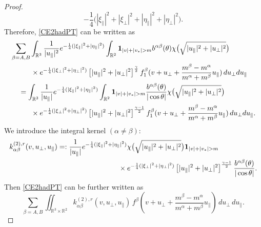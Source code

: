 \documentclass[reqno]{amsart}
\numberwithin{equation}{section}
\numberwithin{equation}{section}
\begin{document}
\begin{proof}
\begin{equation*}
			-\frac{1}{4}\Big(|\xi_{\parallel}|^2+|\xi_{\perp}|^2+|\eta_{\parallel}|^2+|\eta_{\perp}|^2\Big).
		\end{equation*}
		Therefore, \eqref{CE2hadPT} can be written as
		\begin{align}
			& \sum_{\beta=A,B}\int_{\mathbb{R}^3} \frac{1}{|u_{\parallel}|^2} e^{-\frac{1}{4}(|\xi_{\parallel}|^2+|\eta_{\parallel}|^2)}\int_{\mathbb{R}^2}\mathbf{1}_{|v|+|v_*|>m}b^{ \alpha \beta}(\theta)\chi\big(\sqrt{|u_{\parallel}|^2 + |u_{\perp}|^2}\big)  \notag\\
			&\hspace{1cm}\times  e^{-\frac{1}{4}(|\xi_{\perp}|^2+|\eta_{\perp}|^2)} \left[|u_{\parallel}|^2 + |u_{\perp}|^2\right]^{\frac{\gamma}{2}}   f^\beta_1(v + u_{\perp}+\frac{m^{\beta}-m^{\alpha}}{m^{\alpha}+m^{\beta}}u_{\parallel})\, du_{\perp} du_{\parallel} \notag\\
			&\hspace{0.4cm}= \int_{\mathbb{R}^3} \frac{1}{|u_{\parallel}|} e^{-\frac{1}{4}(|\xi_{\parallel}|^2+|\eta_{\parallel}|^2)}\int_{\mathbb{R}^2}\mathbf{1}_{|v|+|v_*|>m} \frac{b^{ \alpha \beta}(\theta)}{|\cos \theta|}\chi\big(\sqrt{|u_{\parallel}|^2 + |u_{\perp}|^2}\big)  \notag\\
			&\hspace{1cm}\times  e^{-\frac{1}{4}(|\xi_{\perp}|^2+|\eta_{\perp}|^2) } \left[|u_{\parallel}|^2 + |u_{\perp}|^2\right]^{\frac{\gamma - 1}{2}}f^\beta_1(v + u_{\perp}+\frac{m^{\beta}-m^{\alpha}}{m^{\alpha}+m^{\beta}}u_{\parallel})  \, du_{\perp} du_{\parallel}.\label{CEs2BDSHH224D2}
		\end{align}
		We introduce the integral kernel $(\alpha \neq \beta)$:
		\begin{align}
			k_{\alpha \beta}^{(2),r}(v,u_{\perp},u_{\parallel})	&=:  \frac{1}{|u_{\parallel}|} e^{-\frac{1}{4}(|\xi_{\parallel}|^2+|\eta_{\parallel}|^2)} \chi\big(\sqrt{|u_{\parallel}|^2 + |u_{\perp}|^2}\big)\mathbf{1}_{|v|+|v_*|>m} \notag\\
			&\hspace{3cm}\times  e^{-\frac{1}{4}(|\xi_{\perp}|^2+|\eta_{\perp}|^2) } \left[|u_{\parallel}|^2 + |u_{\perp}|^2\right]^{\frac{\gamma - 1}{2}}\frac{b^{ \alpha \beta}(\theta)}{|\cos \theta|}.\label{ker2rrr}
		\end{align}
			Then \eqref{CE2hadPT} can be further written as
			\begin{equation*}
				\sum_{\beta=A,B}\iint_{\mathbb{R}^3\times\mathbb{R}^2}k_{\alpha \beta}^{(2),r}(v,u_{\perp},u_{\parallel}) \,f^\beta(v + u_{\perp}+\frac{m^{\beta}-m^{\alpha}}{m^{\alpha}+m^{\beta}}u_{\parallel})\,du_{\perp}\,d u_{\parallel}.
			\end{equation*}
		

\end{proof}
\end{document}
